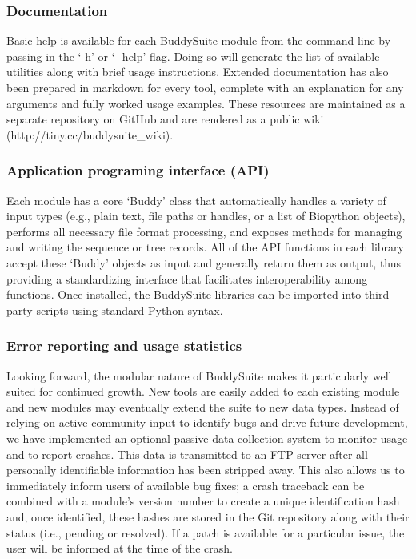 \documentclass[nogrid]{MBE_article}%
\begin{document}
\subsubsection{Documentation}
Basic help is available for each BuddySuite module from the command line by passing in the `-h' or `-{}-help' flag. Doing so will generate the list of available utilities along with brief usage instructions. Extended documentation has also been prepared in markdown for every tool, complete with an explanation for any arguments and fully worked usage examples. These resources are maintained as a separate repository on GitHub and are rendered as a public wiki (http://tiny.cc/buddysuite\_wiki).

\subsubsection{Application programing interface (API)}
Each module has a core `Buddy' class that automatically handles a variety of input types (e.g., plain text, file paths or handles, or a list of Biopython objects), performs all necessary file format processing, and exposes methods for managing and writing the sequence or tree records. All of the API functions in each library accept these `Buddy' objects as input and generally return them as output, thus providing a standardizing interface that facilitates interoperability among functions. Once installed, the BuddySuite libraries can be imported into third-party scripts using standard Python syntax.

\subsubsection{Error reporting and usage statistics}
Looking forward, the modular nature of BuddySuite makes it particularly well suited for continued growth. New tools are easily added to each existing module and new modules may eventually extend the suite to new data types. Instead of relying on active community input to identify bugs and drive future development, we have implemented an optional passive data collection system to monitor usage and to report crashes. This data is transmitted to an FTP server after all personally identifiable information has been stripped away. This also allows us to immediately inform users of available bug fixes; a crash traceback can be combined with a module's version number to create a unique identification hash and, once identified, these hashes are stored in the Git repository along with their status (i.e., pending or resolved). If a patch is available for a particular issue, the user will be informed at the time of the crash.
\end{document}
